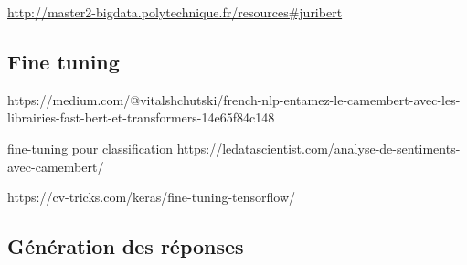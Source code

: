 \documentclass{article}
\begin{document}
\url{http://master2-bigdata.polytechnique.fr/resources#juribert}


\subsection{Fine tuning}
https://medium.com/@vitalshchutski/french-nlp-entamez-le-camembert-avec-les-librairies-fast-bert-et-transformers-14e65f84c148


fine-tuning pour classification
https://ledatascientist.com/analyse-de-sentiments-avec-camembert/

https://cv-tricks.com/keras/fine-tuning-tensorflow/

\subsection{Génération des réponses}
\end{document}
